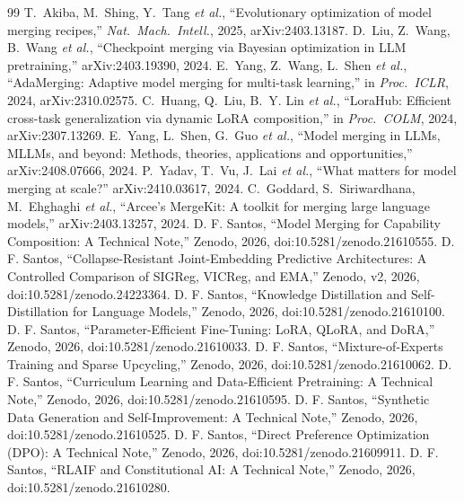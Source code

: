 \documentclass[conference]{IEEEtran}
\begin{document}
\begin{thebibliography}{99}
 T.~Akiba, M.~Shing, Y.~Tang \emph{et al.}, ``Evolutionary optimization of model merging recipes,'' \emph{Nat.\ Mach.\ Intell.}, 2025, arXiv:2403.13187.
 D.~Liu, Z.~Wang, B.~Wang \emph{et al.}, ``Checkpoint merging via Bayesian optimization in LLM pretraining,'' arXiv:2403.19390, 2024.
 E.~Yang, Z.~Wang, L.~Shen \emph{et al.}, ``AdaMerging: Adaptive model merging for multi-task learning,'' in \emph{Proc.\ ICLR}, 2024, arXiv:2310.02575.
 C.~Huang, Q.~Liu, B.~Y. Lin \emph{et al.}, ``LoraHub: Efficient cross-task generalization via dynamic LoRA composition,'' in \emph{Proc.\ COLM}, 2024, arXiv:2307.13269.
 E.~Yang, L.~Shen, G.~Guo \emph{et al.}, ``Model merging in LLMs, MLLMs, and beyond: Methods, theories, applications and opportunities,'' arXiv:2408.07666, 2024.
 P.~Yadav, T.~Vu, J.~Lai \emph{et al.}, ``What matters for model merging at scale?'' arXiv:2410.03617, 2024.
 C.~Goddard, S.~Siriwardhana, M.~Ehghaghi \emph{et al.}, ``Arcee's MergeKit: A toolkit for merging large language models,'' arXiv:2403.13257, 2024.
 D. F. Santos, ``Model Merging for Capability Composition: A Technical Note,'' Zenodo, 2026, doi:10.5281/zenodo.21610555.
 D. F. Santos, ``Collapse-Resistant Joint-Embedding Predictive Architectures: A Controlled Comparison of SIGReg, VICReg, and EMA,'' Zenodo, v2, 2026, doi:10.5281/zenodo.24223364.
 D. F. Santos, ``Knowledge Distillation and Self-Distillation for Language Models,'' Zenodo, 2026, doi:10.5281/zenodo.21610100.
 D. F. Santos, ``Parameter-Efficient Fine-Tuning: LoRA, QLoRA, and DoRA,'' Zenodo, 2026, doi:10.5281/zenodo.21610033.
 D. F. Santos, ``Mixture-of-Experts Training and Sparse Upcycling,'' Zenodo, 2026, doi:10.5281/zenodo.21610062.
 D. F. Santos, ``Curriculum Learning and Data-Efficient Pretraining: A Technical Note,'' Zenodo, 2026, doi:10.5281/zenodo.21610595.
 D. F. Santos, ``Synthetic Data Generation and Self-Improvement: A Technical Note,'' Zenodo, 2026, doi:10.5281/zenodo.21610525.
 D. F. Santos, ``Direct Preference Optimization (DPO): A Technical Note,'' Zenodo, 2026, doi:10.5281/zenodo.21609911.
 D. F. Santos, ``RLAIF and Constitutional AI: A Technical Note,'' Zenodo, 2026, doi:10.5281/zenodo.21610280.
\end{thebibliography}
\end{document}
